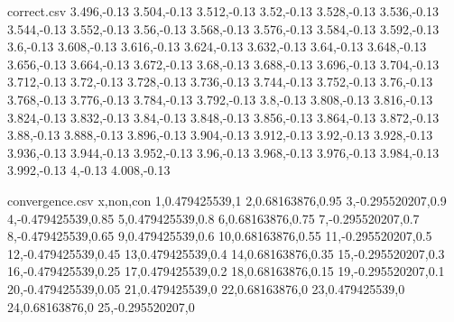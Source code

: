 \begin{filecontents*}{correct.csv}
3.496,-0.13
3.504,-0.13
3.512,-0.13
3.52,-0.13
3.528,-0.13
3.536,-0.13
3.544,-0.13
3.552,-0.13
3.56,-0.13
3.568,-0.13
3.576,-0.13
3.584,-0.13
3.592,-0.13
3.6,-0.13
3.608,-0.13
3.616,-0.13
3.624,-0.13
3.632,-0.13
3.64,-0.13
3.648,-0.13
3.656,-0.13
3.664,-0.13
3.672,-0.13
3.68,-0.13
3.688,-0.13
3.696,-0.13
3.704,-0.13
3.712,-0.13
3.72,-0.13
3.728,-0.13
3.736,-0.13
3.744,-0.13
3.752,-0.13
3.76,-0.13
3.768,-0.13
3.776,-0.13
3.784,-0.13
3.792,-0.13
3.8,-0.13
3.808,-0.13
3.816,-0.13
3.824,-0.13
3.832,-0.13
3.84,-0.13
3.848,-0.13
3.856,-0.13
3.864,-0.13
3.872,-0.13
3.88,-0.13
3.888,-0.13
3.896,-0.13
3.904,-0.13
3.912,-0.13
3.92,-0.13
3.928,-0.13
3.936,-0.13
3.944,-0.13
3.952,-0.13
3.96,-0.13
3.968,-0.13
3.976,-0.13
3.984,-0.13
3.992,-0.13
4,-0.13
4.008,-0.13
\end{filecontents*}

\begin{filecontents*}{convergence.csv}
x,non,con
1,0.479425539,1
2,0.68163876,0.95
3,-0.295520207,0.9
4,-0.479425539,0.85
5,0.479425539,0.8
6,0.68163876,0.75
7,-0.295520207,0.7
8,-0.479425539,0.65
9,0.479425539,0.6
10,0.68163876,0.55
11,-0.295520207,0.5
12,-0.479425539,0.45
13,0.479425539,0.4
14,0.68163876,0.35
15,-0.295520207,0.3
16,-0.479425539,0.25
17,0.479425539,0.2
18,0.68163876,0.15
19,-0.295520207,0.1
20,-0.479425539,0.05
21,0.479425539,0
22,0.68163876,0
23,0.479425539,0
24,0.68163876,0
25,-0.295520207,0
\end{filecontents*}